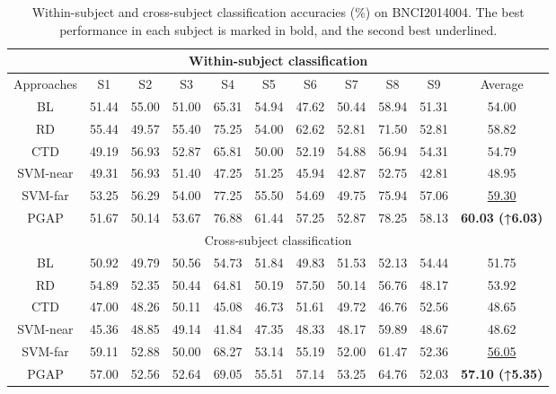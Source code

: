 \documentclass[journal,twocolumn]{IEEEtran}
\begin{document}
\begin{table}[htpb] \centering
  \caption{Within-subject and cross-subject classification accuracies (\%) on BNCI2014004. The best performance in each subject is marked in bold, and the second best underlined.}
  \label{tab:2014004-result}
  \begin{tabular}{c|c|c|c|c|c|c|c|c|c|c}
  \toprule
  \multicolumn{11}{c}{Within-subject classification} \\
  \midrule
  Approaches & S1 & S2 & S3 & S4 & S5 & S6 & S7 & S8 & S9 & Average \\
  \midrule
  BL & 51.44 & 55.00 & 51.00 & 65.31 & 54.94 & 47.62 & 50.44 & 58.94 & 51.31 & 54.00 \\
  RD & 55.44 & 49.57 & 55.40 & 75.25 & 54.00 & 62.62 & 52.81 & 71.50 & 52.81 & 58.82 \\
  CTD & 49.19 & 56.93 & 52.87 & 65.81 & 50.00 & 52.19 & 54.88 & 56.94 & 54.31 & 54.79 \\
  SVM-near & 49.31 & 56.93 & 51.40 & 47.25 & 51.25 & 45.94 & 42.87 & 52.75 & 42.81 & 48.95 \\
  SVM-far & 53.25 & 56.29 & 54.00 & 77.25 & 55.50 & 54.69 & 49.75 & 75.94 & 57.06 & \underline{59.30} \\
  PGAP & 51.67 & 50.14 & 53.67 & 76.88 & 61.44 & 57.25 & 52.87 & 78.25 & 58.13 & \textbf{60.03 (↑6.03)} \\
  \midrule
  \multicolumn{11}{c}{Cross-subject classification} \\
  \midrule
  BL & 50.92 & 49.79 & 50.56 & 54.73 & 51.84 & 49.83 & 51.53 & 52.13 & 54.44 & 51.75 \\
  RD & 54.89 & 52.35 & 50.44 & 64.81 & 50.19 & 57.50 & 50.14 & 56.76 & 48.17 & 53.92 \\
  CTD & 47.00 & 48.26 & 50.11 & 45.08 & 46.73 & 51.61 & 49.72 & 46.76 & 52.56 & 48.65 \\
  SVM-near & 45.36 & 48.85 & 49.14 & 41.84 & 47.35 & 48.33 & 48.17 & 59.89 & 48.67 & 48.62 \\
  SVM-far & 59.11 & 52.88 & 50.00 & 68.27 & 53.14 & 55.19 & 52.00 & 61.47 & 52.36 & \underline{56.05} \\
  PGAP & 57.00 & 52.56 & 52.64 & 69.05 & 55.51 & 57.14 & 53.25 & 64.76 & 52.03 & \textbf{57.10 (↑5.35)} \\
  \bottomrule
  \end{tabular}
\end{table}
\end{document}

